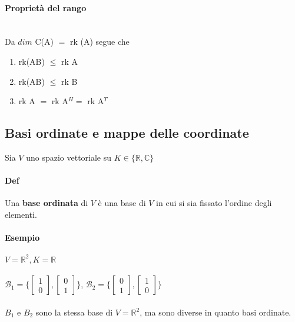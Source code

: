     \paragraph{Proprietà del rango}\hspace{1cm}\\
    Da $dim$ C(A) $=$ rk (A) segue che 
    
    \begin{enumerate}
        \item rk(AB) $\leq$ rk A\\
        \item rk(AB) $\leq$ rk B\\
        \item rk A $=$ rk A$^H=$ rk A$^T$
    \end{enumerate}

\subsection{Basi ordinate e mappe delle coordinate}
Sia $V$ uno spazio vettoriale su $K\in\{\mathbb{R}, \mathbb{C}\}$
\paragraph{Def} Una \textbf{base ordinata} di $V$ è una base di $V$ in cui si sia fissato 
l'ordine degli elementi. 
\paragraph{Esempio} $V= \mathbb{R}^2, K=\mathbb{R}$\\\\
$
\mathcal{B}_1= \Bigg\{ 
    \begin{bmatrix}
        1\\0
    \end{bmatrix}
    ,
    \begin{bmatrix}
        0\\1
    \end{bmatrix}
    \Bigg\}$, $
\mathcal{B}_2= \Bigg\{ 
    \begin{bmatrix}
        0\\1
    \end{bmatrix}
    ,
    \begin{bmatrix}
        1\\0
    \end{bmatrix}
\Bigg\}$\\
\\
$B_1$ e $B_2$ sono la stessa base di $V=\mathbb{R}^2$, ma sono diverse
in quanto basi ordinate.\\


